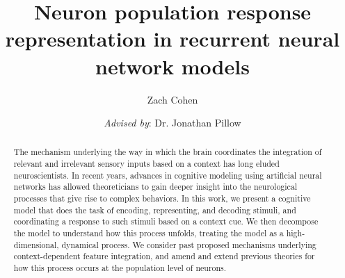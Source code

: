 \documentclass[12pt,a4paper,final]{iopart}
\begin{document}
\title[Neural response representation - IW Report]{Neuron population response representation in recurrent neural network models}

\author{Zach Cohen}
\address{Department of Computer Science}
\address{Princeton University}
\address{Princeton, NJ 08544}

\author{\emph{Advised by}: Dr. Jonathan Pillow}
\address{Princeton Neuroscience Institute}
\address{Princeton University}
\address{Princeton, NJ 08544}

\begin{abstract}
The mechanism underlying the way in which the brain coordinates the integration of relevant and irrelevant sensory inputs based on a context has long eluded neuroscientists. In recent years, advances in cognitive modeling using artificial neural networks has allowed theoreticians to gain deeper insight into the neurological processes that give rise to complex behaviors. In this work, we present a cognitive model that does the task of encoding, representing, and decoding stimuli, and coordinating a response to such stimuli based on a context cue. We then decompose the model to understand how this process unfolds, treating the model as a high-dimensional, dynamical process. We consider past proposed mechanisms underlying context-dependent feature integration, and amend and extend previous theories for how this process occurs at the population level of neurons.
\end{abstract}

\end{document}
